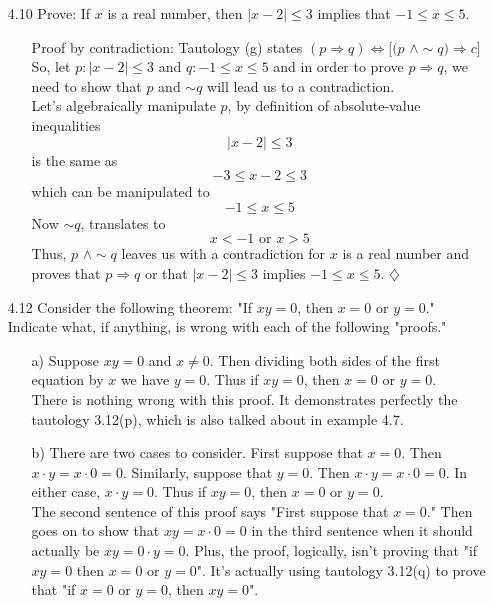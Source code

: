 \documentclass[12pt]{article}
\begin{document}
\begin{enumerate}
\item[4.10] Prove: If $x$ is a real number, then $|x - 2| \leq 3$ implies that $-1 \leq x \leq 5$.
\begin{enumerate}
\item[]
Proof by contradiction: Tautology (g) states $(p \Rightarrow q) \Leftrightarrow [(p\,\, \wedge \sim$$q) \Rightarrow c]$ \\
So, let $p: |x - 2| \leq 3$ and $q: -1 \leq x \leq 5$ and in order to prove $p \Rightarrow q$, we need to show
that $p$ and $\sim$$q$ will lead us to a contradiction. \\
Let's algebraically manipulate $p$, by definition of absolute-value inequalities \[ |x - 2| \leq 3 \] is the same as
\[ -3 \leq x - 2 \leq 3 \] which can be manipulated to \[ -1 \leq x \leq 5 \] Now $\sim$$q$, translates to \[
x < -1 \mbox{ or } x > 5 \] Thus, $p\,\, \wedge \sim$$q$ leaves us with a contradiction for $x$ is a real number
and proves that $p \Rightarrow q$ or that $|x - 2| \leq 3$ implies $-1 \leq x \leq 5$. $\diamondsuit$
\end{enumerate}

\item[4.12] Consider the following theorem: "If $xy = 0$, then $x = 0$ or $y = 0$." Indicate what,
if anything, is wrong with each of the following "proofs."
\begin{enumerate}
\item[a)] Suppose $xy = 0$ and $x \neq 0$. Then dividing both sides of the first equation by $x$ we have $y = 0$. Thus if $xy = 0$, then $x = 0$ or $y = 0$. \\
There is nothing wrong with this proof. It demonstrates perfectly the tautology 3.12(p), which is also talked about in example 4.7.
\item[b)] There are two cases to consider. First suppose that $x = 0$. Then $x \cdot y = x \cdot 0 = 0$. Similarly, suppose that $y = 0$. Then $x \cdot y = x \cdot 0 = 0$. In either case, $x \cdot y = 0$. Thus if $xy = 0$, then $x = 0$ or $y = 0$. \\
The second sentence of this proof says "First suppose that $x = 0$." Then goes on to show that $xy = x \cdot 0 = 0$ in the third sentence when it should actually be $xy = 0 \cdot y = 0$. Plus, the proof, logically, isn't proving that "if $xy = 0$ then $x = 0$ or $y = 0$". It's actually using tautology 3.12(q) to prove that "if $x = 0$ or $y = 0$, then $xy = 0$".
\end{enumerate}


\end{enumerate}
\end{document}
